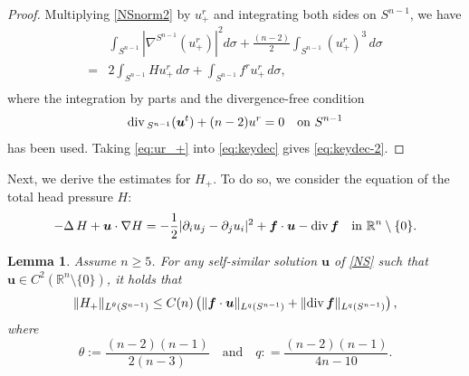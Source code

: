 \documentclass[12pt]{amsart}
\newtheorem{lemma}[theorem]{Lemma}
\renewcommand{\div}{{\rm div \thinspace }}
\newcommand{\Bu}{{\boldsymbol{u}}}
\newcommand{\Bf}{{\boldsymbol{f}}}
\begin{document}
\begin{proof}
		Multiplying \eqref{NSnorm2} by $u^r_+$ and integrating both sides on $S^{n-1}$, we have
		\begin{equation}\label{eq:ur_+}
			\begin{aligned}
				& \int_{S^{n-1}} \left|\nabla^{S^{n-1}} (u^r_+)\right|^2 d\sigma + \frac{ (n-2) }{2} \int_{S^{n-1}}  (u^r_+)^3 \, d\sigma \\
				=& 2 \int_{S^{n-1}} H  u^r_+ \, d\sigma + \int_{S^{n-1}} f^r u_{+}^r \, d\sigma,\\
			\end{aligned}
		\end{equation}
		where the integration by parts and the divergence-free condition
		\begin{equation}
			\label{divfree}  \div_{S^{n-1}}(\Bu^{t} ) + (n-2)u^{r} =0 \quad \text{on }S^{n-1}
		\end{equation}
		has been used.
		Taking \eqref{eq:ur_+} into \eqref{eq:keydec} gives \eqref{eq:keydec-2}.
	\end{proof}
	
	
	Next, we derive the estimates for $H_+$. To do so, we consider the equation of the total head pressure $H$:
	\begin{align} \label{eq:headpre2}
		-\Delta \, H
		+ \Bu \cdot \nabla H
		= - \frac{1}{2} |\partial_i u_j - \partial_j u_i |^2
		+\Bf\cdot \Bu - \div \Bf \quad \text{in }\mathbb{R}^n \setminus \{0\}.
	\end{align}
	
	
	\begin{lemma}\label{lem:H+control}
		Assume $n\geq 5$. For any self-similar solution $\Bu$ of \eqref{NS} such that $\Bu \in C^2(\mathbb{R}^n \setminus\{0\})$,
		it holds that
		\begin{equation}\label{eq:secestforH}
			\|H_+\|_{L^{\theta}(S^{n-1})} \leq C(n)\left( \|\Bf\cdot \Bu\|_{L^q(S^{n-1})} + \|\div \Bf\|_{L^q(S^{n-1})} \right),
		\end{equation}
		where
		\begin{equation}\label{eq:theta}
			\theta := \frac{(n-2)(n-1)}{2(n-3)}\quad \text{and} \quad q: =\frac{(n-2)(n-1)}{4n-10}.
		\end{equation} 
	\end{lemma}
	
\end{document}
